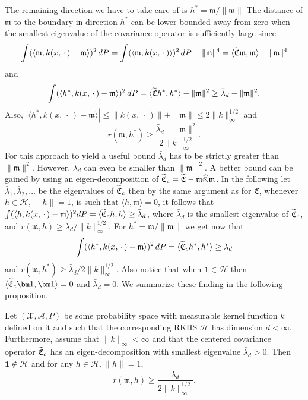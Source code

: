 \documentclass[10pt]{amsart}
\theoremstyle{definition}\newtheorem{defi}[theo]{Definition}\newtheorem{rema}[theo]{Remark}\newtheorem{exam}[theo]{Example}\newtheorem{exem}[theo]{Example}\newtheorem{nota}[theo]{Notation}
\theoremstyle{remark}
\newcommand{\X}{\mathcal{X}}
\newcommand{\clA}{\mathcal{A}}
\newcommand{\cH}{\mathcal{H}}
\newcommand{\fkC}{\mathfrak{C}}
\newcommand{\mean}{\mathfrak{m}}
\let\oldtilde\tilde
\renewcommand*{\tilde}[1]{\mathchoice{\widetilde{#1}}{\widetilde{#1}}{\oldtilde{#1}}{\oldtilde{#1}}}
\begin{document}
The remaining direction we have to take care of is $h^* = \mean/\|\mean\|$ The distance of $\mean$ to the boundary in direction $h^*$ can be lower bounded away from zero when the smallest eigenvalue of the covariance operator is sufficiently large since
\[
\int (\langle \mean,k(x,\,\cdot\,) - \mean \rangle)^2 \,dP = \int (\langle \mean, k(x,\,\cdot\,)
\rangle)^2 \,dP - \|\mean\|^4 = \langle \tilde{\fkC} \mean,\mean \rangle - \|\mean\|^4
\]
and
\[
\int (\langle h^*,k(x,\,\cdot\,) - \mean \rangle)^2 \,dP = \langle \tilde{\fkC} h^*,h^* \rangle - \|\mean\|^2 \geq \bar \lambda_d - \|\mean\|^2.
\]
Also, $|\langle h^*,k(x,\,\cdot\,) - \mean \rangle|
\leq \|k(x,\,\cdot\,)\| + \|\mean\| \leq 2 \|k\|_\infty^{1/2}$ and
\[
r(\mean,h^*) \geq \frac{\bar{\lambda}_d- \|\mean\|^2}{2\|k\|_\infty^{1/2}}.
\]
For this approach to yield a useful bound $\bar \lambda_d$ has to be strictly greater than $\|\mean\|^2$. However, $\bar \lambda_d$ can even be smaller than $\|\mean\|^2$. A better bound can be gained by using an eigen-decomposition of $\tilde{\fkC}_c = \tilde{\fkC} - \mean \widehat{\otimes} \mean$. In the following let $\bar \lambda_1, \bar \lambda_2, \dots$ be the eigenvalues of $ \tilde{\fkC}_c$ then by the same argument as for $\fkC$, whenever $h \in \cH$, $\|h\|=1$, is such that $\langle h, \mean \rangle = 0$, it follows that $\int (\langle h, k(x,\,\cdot\,) - \mean \rangle)^2 dP = \langle \tilde{\fkC}_c h, h \rangle \geq \bar \lambda_d$, where $\bar \lambda_d$ is the smallest eigenvalue of $ \tilde{\fkC}_c$, and $r(\mean,h) \geq \bar \lambda_d/\|k\|_\infty^{1/2}$. For $h^* = \mean/\|\mean\|$ we get now that
\[
\int (\langle h^*,k(x,\,\cdot\,) - \mean \rangle)^2 \,dP =
\langle \tilde{\fkC}_c h^*,h^* \rangle \geq \bar \lambda_d
\]
and $r(\mean,h^*) \geq \bar \lambda_d/2\|k\|_\infty^{1/2}$. Also notice that when $\bm 1 \in \cH$ then $\langle \tilde{\fkC}_c \bm 1,\bm 1 \rangle = 0$ and $\bar \lambda_d = 0$. We summarize these finding in the following proposition.

\begin{prop}\label{prop:cov_bound_radius}
Let $(\X,\clA,P)$ be some probability space with measurable kernel function $k$ defined on it and such that the corresponding RKHS $\cH$ has dimension $d<\infty$. Furthermore, assume that $\|k\|_\infty < \infty$ and that the centered covariance operator $\tilde{\fkC}_c$ has an eigen-decomposition with smallest eigenvalue $\bar \lambda_d > 0$. Then $\bm 1 \not \in \cH$ and for any $h\in \cH, \|h\| =1$,
\[
r(\mean,h) \geq \frac{\bar \lambda_d}{2\|k\|_\infty^{1/2}}.
\]
\end{prop}
\end{document}
